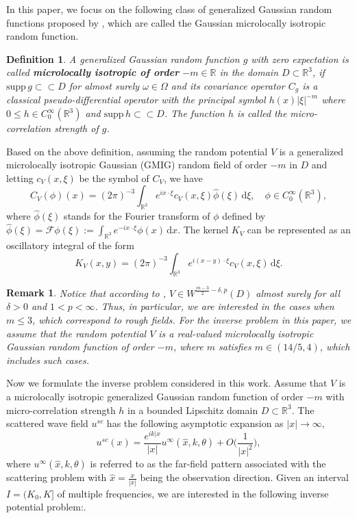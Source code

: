 \documentclass[reqno, 12pt]{amsart}
\newtheorem{remark}[theorem]{Remark}
\newtheorem{Def}{Definition}[section]
\numberwithin{equation}{section}
\begin{document}
In this paper, we focus on the following class of generalized Gaussian random functions proposed by \cite{LPS}, which are
called the Gaussian microlocally isotropic random function.
\begin{Def}\label{Def2.1}
	A generalized Gaussian random function $g$ with zero expectation is called \textbf{microlocally isotropic of order} $-m \in \mathbb{R}$ in the domain $D \subset \mathbb{R}^3$, if $\text{supp}\, g \subset \subset D$ for almost surely $\omega \in \Omega$ and its covariance operator $C_g$ is a classical pseudo-differential operator with the principal symbol $h(x)|\xi|^{-m}$ where $0 \le h \in C^\infty_0(\mathbb{R}^3)$ and $\text{supp} \, h \subset \subset D$. The function $h$ is called the micro-correlation strength of $g$.
\end{Def} 

Based on the above definition, assuming the random potential $V$ is a generalized microlocally isotropic Gaussian (GMIG) random field of order $-m$ in $D$ and
letting $c_V(x,\xi)$ be the symbol of $C_V$, we have \[
C_V(\phi)(x)=(2 \pi)^{-3} \int_{\mathbb{R}^3} e^{i x \cdot \xi} c_V(x, \xi) \hat{\phi}(\xi) \,\mathrm{d}\xi, \quad \phi \in C_0^\infty(\mathbb{R}^3),
\] where $\hat{\phi}(\xi)$ stands for the Fourier transform of $\phi$ defined by $
\hat{\phi}(\xi)=\mathcal{F}\phi(\xi):=\int_{\mathbb{R}^3} e^{-i x \cdot \xi} \phi(x) \,\mathrm{d}x.$  
The kernel $K_V$ can be represented as an oscillatory integral of the form \begin{equation*}
	K_V(x,y)=(2\pi)^{-3} \int_{\mathbb{R}^3} e^{i (x-y) \cdot \xi} c_V(x, \xi) \,\mathrm{d}\xi.
\end{equation*}
\begin{remark}
Notice that according to \cite{li2021inverse}, $V \in W^{\frac{m-3}{2}-\delta,p}(D)$ almost surely for all $\delta>0$ and $1<p<\infty$. Thus, in particular, we are interested 
in the cases when $m\leq 3$, which correspond to rough fields. For the inverse problem in this paper, we assume that the random potential $V$ is a real-valued microlocally isotropic Gaussian random function of order $-m$, where $m$ satisfies $m \in (14/5,4)$, which includes such cases.
\end{remark}
Now we formulate the inverse problem considered in this work. 
Assume that $V$ is a microlocally isotropic generalized Gaussian random function of order $-m$ with micro-correlation strength $h$ in a bounded Lipschitz domain
$D \subset \mathbb{R}^3$.  The scattered wave field $u^{sc}$ has the following asymptotic expansion as $|x|\to\infty$,
\[
u^{sc}(x) = \frac{e^{ik|x}}{|x|} u^\infty(\hat{x},k, \theta) + O\Big(\frac{1}{|x|^2}\Big),
\]
where $u^\infty(\hat{x}, k, \theta)$ is referred to as the far-field pattern associated with the scattering problem with $\hat{x}= \frac{x}{|x|}$ being the observation direction. 
Given an interval $I = (K_0, K]$ of multiple frequencies, we are interested in the following inverse potential problem:. 
\end{document}
